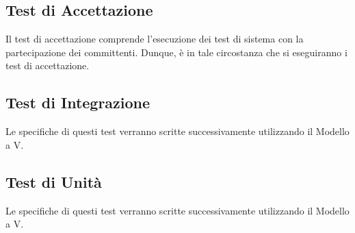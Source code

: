 	\subsection{Test di Accettazione}
	Il test di accettazione comprende l'esecuzione dei test di sistema con la partecipazione dei committenti. Dunque, è in tale circostanza che si eseguiranno i test di accettazione. 
	\subsection{Test di Integrazione}
	Le specifiche di questi test verranno scritte successivamente utilizzando il Modello a V.
	\subsection{Test di Unità}
	Le specifiche di questi test verranno scritte successivamente utilizzando il Modello a V.
